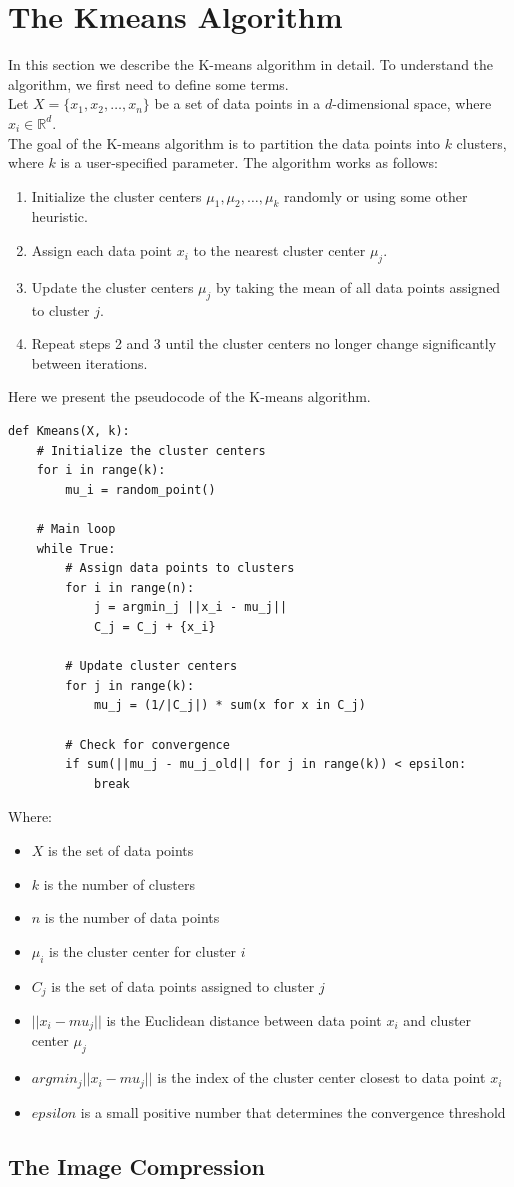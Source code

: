 \documentclass[12pt,oneside,a4paper]{article}
\begin{document}
\section{The Kmeans Algorithm} \label{sec:sec1}
In this section we describe the K-means algorithm in detail. To understand the algorithm, we first need to define some terms.\\
Let $X = \{x_1, x_2, \ldots, x_n\}$ be a set of data points in a $d$-dimensional space, where $x_i \in \mathbb{R}^d$.\\
The goal of the K-means algorithm is to partition the data points into $k$ clusters, where $k$ is a user-specified parameter.
The algorithm works as follows:
\begin{enumerate}
	\item Initialize the cluster centers $\mu_1, \mu_2, \ldots, \mu_k$ randomly or using some other heuristic.
	\item Assign each data point $x_i$ to the nearest cluster center $\mu_j$.
	\item Update the cluster centers $\mu_j$ by taking the mean of all data points assigned to cluster $j$.
	\item Repeat steps 2 and 3 until the cluster centers no longer change significantly between iterations.
\end{enumerate}
Here we present the pseudocode of the K-means algorithm.
\begin{lstlisting}[label={list:kmeans},caption={K-means algorithm}]
	def Kmeans(X, k):
	# Initialize the cluster centers
	for i in range(k):
		mu_i = random_point()
	
	# Main loop
	while True:
		# Assign data points to clusters
		for i in range(n):
			j = argmin_j ||x_i - mu_j||
			C_j = C_j + {x_i}
		
		# Update cluster centers
		for j in range(k):
			mu_j = (1/|C_j|) * sum(x for x in C_j)
		
		# Check for convergence
		if sum(||mu_j - mu_j_old|| for j in range(k)) < epsilon:
			break
\end{lstlisting}
Where:
\begin{itemize}
	\item $X$ is the set of data points
	\item $k$ is the number of clusters
	\item $n$ is the number of data points
	\item $\mu_i$ is the cluster center for cluster $i$
	\item $C_j$ is the set of data points assigned to cluster $j$
	\item $||x_i - mu_j||$ is the Euclidean distance between data point $x_i$ and cluster center $\mu_j$
	\item $argmin_j ||x_i - mu_j||$ is the index of the cluster center closest to data point $x_i$
	\item $epsilon$ is a small positive number that determines the convergence threshold
\end{itemize}



\subsection{The Image Compression} \label{sec:sub1}





\printbibliography
\end{document}
